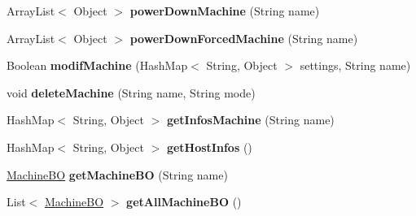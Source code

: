 \begin{DoxyCompactItemize}
\item 
\mbox{\label{classrwb_1_1java_1_1vb_1_1bo_1_1_virtual_box_b_o_ac09a5906c9a313a13ee809fb0687e211}} 
Array\+List$<$ Object $>$ {\bfseries power\+Down\+Machine} (String name)
\item 
\mbox{\label{classrwb_1_1java_1_1vb_1_1bo_1_1_virtual_box_b_o_a483e4b1c94064069673fa5c24ef23688}} 
Array\+List$<$ Object $>$ {\bfseries power\+Down\+Forced\+Machine} (String name)
\item 
\mbox{\label{classrwb_1_1java_1_1vb_1_1bo_1_1_virtual_box_b_o_a2a1790c3e9dc43811f8b53c89f4bdefe}} 
Boolean {\bfseries modif\+Machine} (Hash\+Map$<$ String, Object $>$ settings, String name)
\item 
\mbox{\label{classrwb_1_1java_1_1vb_1_1bo_1_1_virtual_box_b_o_a8d07b76582009e236dcbcc82275cb872}} 
void {\bfseries delete\+Machine} (String name, String mode)
\item 
\mbox{\label{classrwb_1_1java_1_1vb_1_1bo_1_1_virtual_box_b_o_a1234df8ebcd0a7f683d76def1210fdda}} 
Hash\+Map$<$ String, Object $>$ {\bfseries get\+Infos\+Machine} (String name)
\item 
\mbox{\label{classrwb_1_1java_1_1vb_1_1bo_1_1_virtual_box_b_o_ad4537300c54eb77bd3ccb8b58b404395}} 
Hash\+Map$<$ String, Object $>$ {\bfseries get\+Host\+Infos} ()
\item 
\mbox{\label{classrwb_1_1java_1_1vb_1_1bo_1_1_virtual_box_b_o_a4991b774d249f96a605835e6b9a2404a}} 
\hyperlink{classrwb_1_1java_1_1vb_1_1bo_1_1_machine_b_o}{Machine\+BO} {\bfseries get\+Machine\+BO} (String name)
\item 
\mbox{\label{classrwb_1_1java_1_1vb_1_1bo_1_1_virtual_box_b_o_a29370341ce0a90b6721b5d282e114e61}} 
List$<$ \hyperlink{classrwb_1_1java_1_1vb_1_1bo_1_1_machine_b_o}{Machine\+BO} $>$ {\bfseries get\+All\+Machine\+BO} ()

\end{DoxyCompactItemize}
